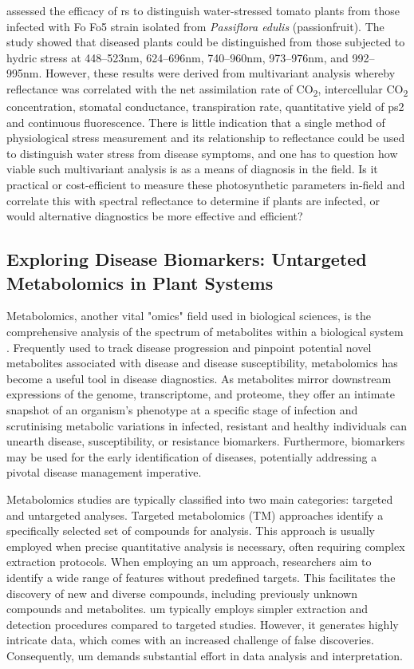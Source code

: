 \textcite{Marin2020} assessed the efficacy of \ac{rs} to distinguish water-stressed tomato plants from those infected with \ac{Fo} Fo5 strain isolated from \textit{Passiflora edulis} (passionfruit). The study showed that diseased plants could be distinguished from those subjected to hydric stress at 448–523nm, 624–696nm, 740–960nm, 973–976nm, and 992–995nm. However, these results were derived from multivariant analysis whereby reflectance was correlated with the net assimilation rate of CO\textsubscript{2}, intercellular CO\textsubscript{2} concentration, stomatal conductance, transpiration rate, quantitative yield of \ac{ps2} and continuous fluorescence. There is little indication that a single method of physiological stress measurement and its relationship to reflectance could be used to distinguish water stress from disease symptoms, and one has to question how viable such multivariant analysis is as a means of diagnosis in the field. Is it practical or cost-efficient to measure these photosynthetic parameters in-field and correlate this with spectral reflectance to determine if plants are infected, or would alternative diagnostics be more effective and efficient?   

\subsection{Exploring Disease Biomarkers: Untargeted Metabolomics in Plant Systems}

Metabolomics, another vital "omics" field used in biological sciences, is the comprehensive analysis of the spectrum of metabolites within a biological system \parencite{Klassen2017}. Frequently used to track disease progression and pinpoint potential novel metabolites associated with disease and disease susceptibility, metabolomics has become a useful tool in disease diagnostics. As metabolites mirror downstream expressions of the genome, transcriptome, and proteome, they offer an intimate snapshot of an organism's phenotype at a specific stage of infection and scrutinising metabolic variations in infected, resistant and healthy individuals can unearth disease, susceptibility, or resistance biomarkers. Furthermore, biomarkers may be used for the early identification of diseases, potentially addressing a pivotal disease management imperative. 

Metabolomics studies are typically classified into two main categories: targeted and untargeted analyses. Targeted metabolomics (TM) approaches identify a specifically selected set of compounds for analysis. This approach is usually employed when precise quantitative analysis is necessary, often requiring complex extraction protocols. When employing an \ac{um} approach, researchers aim to identify a wide range of features without predefined targets. This facilitates the discovery of new and diverse compounds, including previously unknown compounds and metabolites. \ac{um} typically employs simpler extraction and detection procedures compared to targeted studies. However, it generates highly intricate data, which comes with an increased challenge of false discoveries. Consequently, \ac{um} demands substantial effort in data analysis and interpretation.

